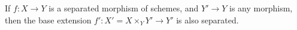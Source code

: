 If $f: X \to Y$ is a separated morphism of schemes, and $Y' \to Y$ is any morphism, then the base extension $f': X' = X \times_Y Y' \to Y'$ is also separated.
